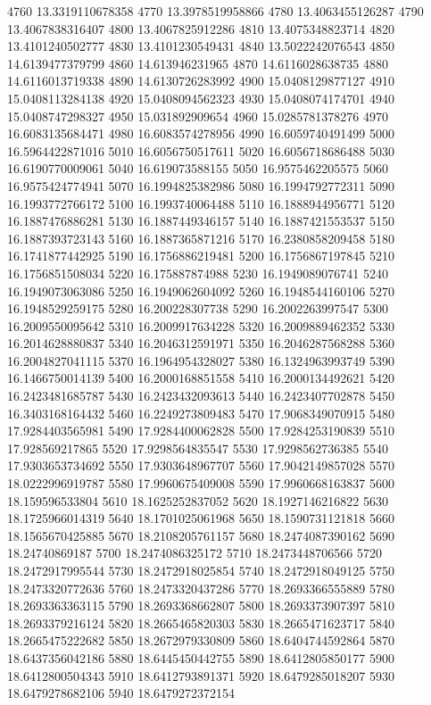 {4760 13.3319110678358
4770 13.3978519958866
4780 13.4063455126287
4790 13.4067838316407
4800 13.4067825912286
4810 13.4075348823714
4820 13.4101240502777
4830 13.4101230549431
4840 13.5022242076543
4850 14.6139477379799
4860 14.613946231965
4870 14.6116028638735
4880 14.6116013719338
4890 14.6130726283992
4900 15.0408129877127
4910 15.0408113284138
4920 15.0408094562323
4930 15.0408074174701
4940 15.0408747298327
4950 15.031892909654
4960 15.0285781378276
4970 16.6083135684471
4980 16.6083574278956
4990 16.6059740491499
5000 16.5964422871016
5010 16.6056750517611
5020 16.6056718686488
5030 16.6190770009061
5040 16.619073588155
5050 16.9575462205575
5060 16.9575424774941
5070 16.1994825382986
5080 16.1994792772311
5090 16.1993772766172
5100 16.1993740064488
5110 16.1888944956771
5120 16.1887476886281
5130 16.1887449346157
5140 16.1887421553537
5150 16.1887393723143
5160 16.1887365871216
5170 16.2380858209458
5180 16.1741877442925
5190 16.1756886219481
5200 16.1756867197845
5210 16.1756851508034
5220 16.175887874988
5230 16.1949089076741
5240 16.1949073063086
5250 16.1949062604092
5260 16.1948544160106
5270 16.1948529259175
5280 16.200228307738
5290 16.2002263997547
5300 16.2009550095642
5310 16.2009917634228
5320 16.2009889462352
5330 16.2014628880837
5340 16.2046312591971
5350 16.2046287568288
5360 16.2004827041115
5370 16.1964954328027
5380 16.1324963993749
5390 16.1466750014139
5400 16.2000168851558
5410 16.2000134492621
5420 16.2423481685787
5430 16.2423432093613
5440 16.2423407702878
5450 16.3403168164432
5460 16.2249273809483
5470 17.9068349070915
5480 17.9284403565981
5490 17.9284400062828
5500 17.9284253190839
5510 17.928569217865
5520 17.9298564835547
5530 17.9298562736385
5540 17.9303653734692
5550 17.9303648967707
5560 17.9042149857028
5570 18.0222996919787
5580 17.9960675409008
5590 17.9960668163837
5600 18.159596533804
5610 18.1625252837052
5620 18.1927146216822
5630 18.1725966014319
5640 18.1701025061968
5650 18.1590731121818
5660 18.1565670425885
5670 18.2108205761157
5680 18.2474087390162
5690 18.24740869187
5700 18.2474086325172
5710 18.2473448706566
5720 18.2472917995544
5730 18.2472918025854
5740 18.2472918049125
5750 18.2473320772636
5760 18.2473320437286
5770 18.2693366555889
5780 18.2693363363115
5790 18.2693368662807
5800 18.2693373907397
5810 18.2693379216124
5820 18.2665465820303
5830 18.2665471623717
5840 18.2665475222682
5850 18.2672979330809
5860 18.6404744592864
5870 18.6437356042186
5880 18.6445450442755
5890 18.6412805850177
5900 18.6412800504343
5910 18.6412793891371
5920 18.6479285018207
5930 18.6479278682106
5940 18.6479272372154
}
